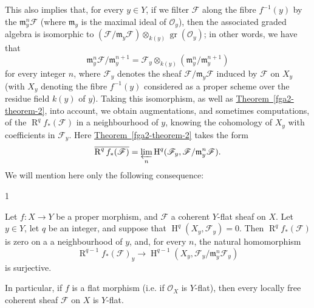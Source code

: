   This also implies that, for every \(y\in  Y\), if we filter \(\mathscr {F}\) along the fibre \(f^{-1}(y)\) by the \(\mathfrak {m}_y^n\mathscr {F}\) (where \(\mathfrak {m}_y\) is the maximal ideal of \(\mathcal {O}_y\)), then the associated graded algebra is isomorphic to \((\mathscr {F}/\mathfrak {m}_y\mathscr {F})\otimes _{k(y)}\operatorname {gr}(\mathcal {O}_y)\);
  in other words, we have that
  \[     \mathfrak {m}_y^n\mathscr {F}/\mathfrak {m}_y^{n+1}     = \mathscr {F}_y\otimes _{k(y)}(\mathfrak {m}_y^n/\mathfrak {m}_y^{n+1})   \]
  for every integer \(n\), where \(\mathscr {F}_y\) denotes the sheaf \(\mathscr {F}/\mathfrak {m}_y\mathscr {F}\) induced by \(\mathscr {F}\) on \(X_y\) (with \(X_y\) denoting the fibre \(f^{-1}(y)\) considered as a proper scheme over the residue field \(k(y)\) of \(y\)).
  Taking this isomorphism, as well as \hyperref[fga2-theorem-2]{Theorem~\ref*{fga2-theorem-2}}, into account, we obtain augmentations, and sometimes computations, of the \(\operatorname {R}^q f_*(\mathscr {F})\) in a neighbourhood of \(y\), knowing the cohomology of \(X_y\) with coefficients in \(\mathscr {F}_y\).
  Here \hyperref[fga2-theorem-2]{Theorem~\ref*{fga2-theorem-2}} takes the form
  \[     \overline {\operatorname {R}^q f_*(\mathscr {F})}     = \varprojlim _n \operatorname {H}^q(\mathscr {F}_y,\mathscr {F}/\mathfrak {m}_y^n\mathscr {F}).   \]
  We will mention here only the following consequence:\begin{proposition}{1}\label{fga2-proposition-1}\skipsinglepar\par{}Let \(f\colon  X\to  Y\) be a proper morphism, and \(\mathscr {F}\) a coherent \(Y\)-flat sheaf on \(X\).
    Let \(y\in  Y\), let \(q\) be an integer, and suppose that \(\operatorname {H}^q(X_y,\mathscr {F}_y)=0\).
    Then \(\operatorname {R}^q f_*(\mathscr {F})\) is zero on a a neighbourhood of \(y\), and, for every \(n\), the natural homomorphism
    \[       \operatorname {R}^{q-1}f_*(\mathscr {F})_y       \to  \operatorname {H}^{q-1}(X_y,\mathscr {F}_y/\mathfrak {m}_y^n\mathscr {F}_y)     \]
    is surjective.\end{proposition}\par{}In particular, if \(f\) is a flat morphism (i.e. if \(\mathcal {O}_X\) is \(Y\)-flat), then every locally free coherent sheaf \(\mathscr {F}\) on \(X\) is \(Y\)-flat.
